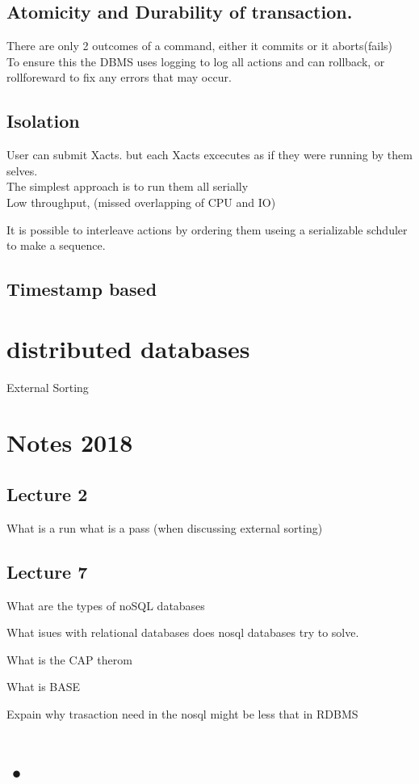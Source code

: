 \documentclass[a4paper,10pt,titlepage]{report}
\begin{document}
\subsection{Atomicity and Durability of transaction.}
There are only 2 outcomes of a command, either it commits or it aborts(fails)\\

To ensure this the DBMS uses logging to log all actions and can rollback, or rollforeward to fix any errors that may occur.

\subsection{Isolation}
User can submit Xacts. but each Xacts excecutes as if they were running by them selves. \\
The simplest approach is to run them all serially\\
\hspace{10mm} Low throughput, (missed overlapping of CPU and IO)

It is possible to interleave actions by ordering them useing a serializable schduler to make a sequence.\\


\subsection{Timestamp based}



\section{distributed databases}




External Sorting 





\section{Notes 2018}

\subsection{Lecture 2}
What is a run what is a pass (when discussing external sorting)



\subsection{Lecture 7}

What are the types of noSQL databases


What isues with relational databases does nosql databases try to solve.

What is the CAP therom

What is BASE

Expain why trasaction need in the nosql might be less that in RDBMS

	
\section{•}	
\end{document}
